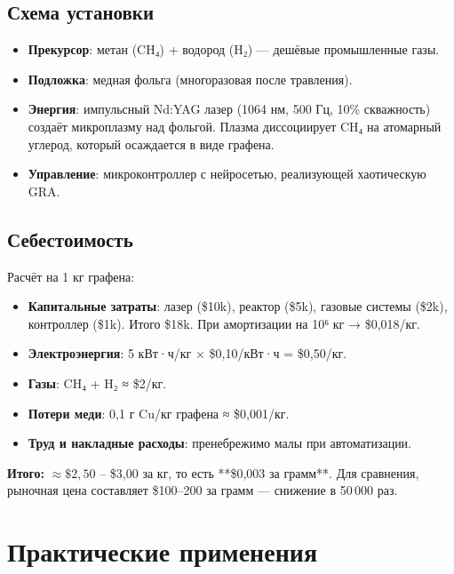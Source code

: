 \documentclass[12pt,a4paper]{article}
\begin{document}
\subsection{Схема установки}
\begin{itemize}
    \item \textbf{Прекурсор}: метан (CH₄) + водород (H₂) — дешёвые промышленные газы.
    \item \textbf{Подложка}: медная фольга (многоразовая после травления).
    \item \textbf{Энергия}: импульсный Nd:YAG лазер (1064 нм, 500 Гц, 10\% скважность) создаёт микроплазму над фольгой. Плазма диссоциирует CH₄ на атомарный углерод, который осаждается в виде графена.
    \item \textbf{Управление}: микроконтроллер с нейросетью, реализующей хаотическую GRA.
\end{itemize}

\subsection{Себестоимость}

Расчёт на 1 кг графена:

\begin{itemize}
    \item \textbf{Капитальные затраты}: лазер (\$10k), реактор (\$5k), газовые системы (\$2k), контроллер (\$1k). Итого \$18k. При амортизации на 10⁶ кг → \$0,018/кг.
    \item \textbf{Электроэнергия}: 5 кВт·ч/кг × \$0,10/кВт·ч = \$0,50/кг.
    \item \textbf{Газы}: CH₄ + H₂ ≈ \$2/кг.
    \item \textbf{Потери меди}: 0,1 г Cu/кг графена ≈ \$0,001/кг.
    \item \textbf{Труд и накладные расходы}: пренебрежимо малы при автоматизации.
\end{itemize}

\textbf{Итого:} \(\approx \$2,50\) – \$3,00 за кг, то есть **\$0,003 за грамм**. Для сравнения, рыночная цена составляет \$100–200 за грамм — снижение в 50 000 раз.

\section{Практические применения}
\end{document}
